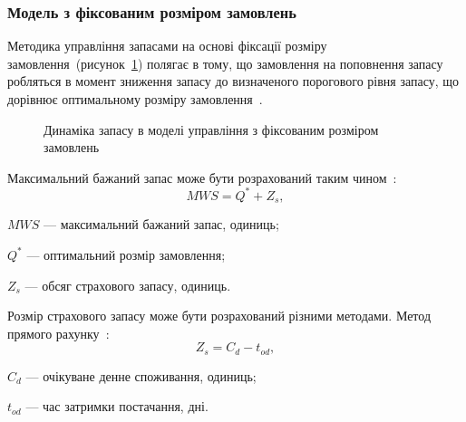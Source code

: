 \subsubsection{Модель з фіксованим розміром замовлень}
Методика управління запасами на основі фіксації розміру замовлення~(рисунок~\ref{fig:model_fs:dynamic}) полягає в тому, що замовлення на поповнення запасу робляться в момент зниження запасу до визначеного порогового рівня запасу, що дорівнює оптимальному розміру замовлення~\cite{Sterligova2008}. 

\begin{figure}[H]
  \centering
{}
  \captionsetup{justification=centering}
  \caption{Динаміка запасу в моделі управління з фіксованим розміром замовлень}
  \label{fig:model_fs:dynamic}
\end{figure}

Максимальний бажаний запас може бути розрахований таким чином~\cite{Sterligova2008}:
\begin{equation} \label{eq:model_fs:mws}
MWS=Q^*+Z_s
,
\end{equation}
\begin{description}
	\item[де] $MWS$ --- максимальний бажаний запас, одиниць;
	\item $Q^*$ --- оптимальний розмір замовлення;
	\item $Z_s$ --- обсяг страхового запасу, одиниць.
\end{description}

Розмір страхового запасу може бути розрахований різними методами.
Метод прямого рахунку~\cite{Sterligova2008}:
\begin{equation} \label{eq:model_fs:zs1}
Z_s=C_d-t_{od}
,
\end{equation}
\begin{description}
	\item[де] $C_d$ --- очікуване денне споживання, одиниць;
	\item $t_{od}$ --- час затримки постачання, дні.
\end{description}

